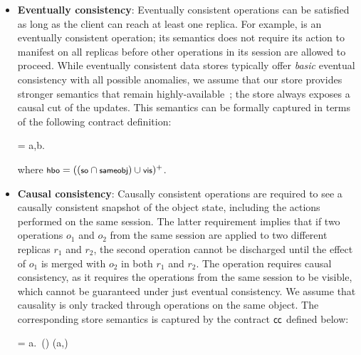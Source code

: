 \begin{itemize}
\setlength{\itemsep}{2pt}

\item \textbf{Eventually consistency}: Eventually consistent operations can
  be satisfied as long as the client can reach at least one replica. For
  example,  is an eventually consistent operation; its semantics
  does not require its action to manifest on all replicas before other
  operations in its session are allowed to proceed. While eventually
  consistent data stores typically offer \emph{basic} eventual consistency
  with all possible anomalies, we assume that our store provides stronger
  semantics that remain highly-available~\cite{BailisHAT,COPS}; the store
  always exposes a causal cut of the updates. This semantics can be formally
  captured in terms of the following contract definition:

  \vspace{-1em}
  \begin{smathpar}
  \ecc = \forall a,b. ~ \wedge {} \Rightarrow {}
  \end{smathpar}
  \noindent where $\small \hboZ = ((\soZ \cap \sameobjZ) \cup \visZ)^+$.

\item \textbf{Causal consistency}: Causally consistent operations are required
	to see a causally consistent snapshot of the object state, including the
	actions performed on the same session.  The latter requirement implies that
	if two operations $o_1$ and $o_2$ from the same session are applied to two
	different replicas $r_1$ and $r_2$, the second operation cannot be discharged
	until the effect of $o_1$ is merged with $o_2$ in both $r_1$ and $r_2$. The
	 operation requires causal consistency, as it requires the
	operations from the same session to be visible, which cannot be guaranteed
	under just eventual consistency. We assume that causality is only tracked
	through operations on the same object. The corresponding store semantics is
	captured by the contract ${\sf cc}$ defined below:

  \vspace{-1em}
  \begin{smathpar}
  \ccc = \forall a.~(\hboZ \cap \sameobjZ) (a,\cureff) \Rightarrow {}
  \end{smathpar}



\end{itemize}
